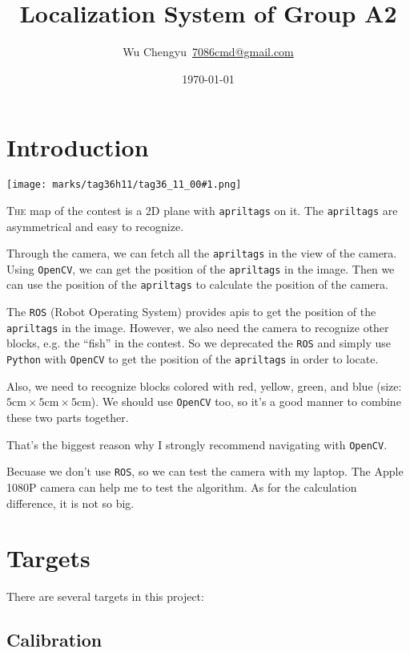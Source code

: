 \documentclass{article}
\title{Localization System of Group A2}
\author{Wu Chengyu\ \url{7086cmd@gmail.com}}
\date{\today}
\newcommand{\apriltag}[1]{
    \texttt{[image: marks/tag36h11/tag36\_11\_00\#1.png]}
}
\begin{document}
\maketitle

\newpage

\tableofcontents

\newpage

\section{Introduction}

\apriltag{001}

\lettrine{T}{he} map of the contest is a 2D plane with \texttt{apriltags} on it. The \texttt{apriltags} are asymmetrical and easy to recognize.

Through the camera, we can fetch all the \texttt{apriltags} in the view of the camera. Using \texttt{OpenCV}, we can get the position of the \texttt{apriltags} in the image. Then we can use the position of the \texttt{apriltags} to calculate the position of the camera.

The \texttt{ROS} (Robot Operating System) provides apis to get the position of the \texttt{apriltags} in the image. However, we also need the camera to recognize other blocks, e.g. the ``fish'' in the contest. So we deprecated the \texttt{ROS} and simply use \texttt{Python} with \texttt{OpenCV} to get the position of the \texttt{apriltags} in order to locate.

Also, we need to recognize blocks colored with red, yellow, green, and blue (size: $5\mathrm{cm}\times5\mathrm{cm}\times5\mathrm{cm}$). We should use \texttt{OpenCV} too, so it's a good manner to combine these two parts together.

That's the biggest reason why I strongly recommend navigating with \texttt{OpenCV}.

Becuase we don't use \texttt{ROS}, so we can test the camera with my laptop. The Apple 1080P camera can help me to test the algorithm. As for the calculation difference, it is not so big.


\section{Targets}

There are several targets in this project:

\subsection{Calibration}
\end{document}
